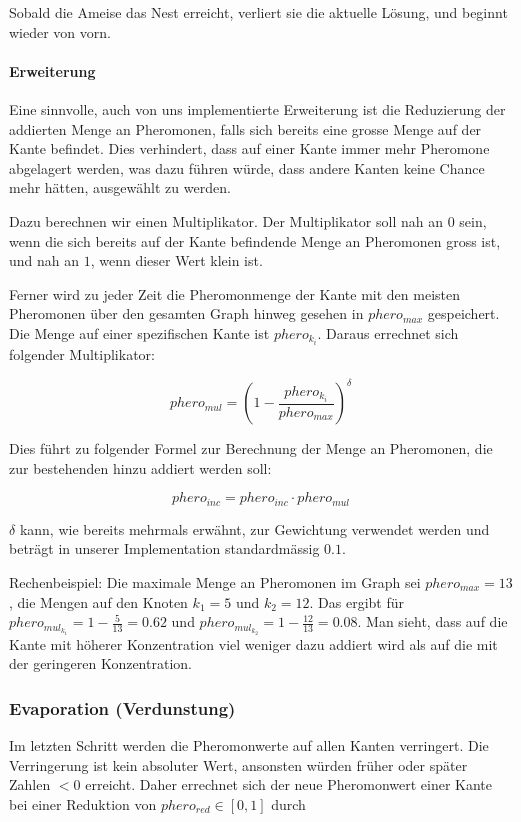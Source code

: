 Sobald die Ameise das Nest erreicht, verliert sie die aktuelle Lösung, und
beginnt wieder von vorn.

\paragraph*{Erweiterung}

Eine sinnvolle, auch von uns implementierte Erweiterung ist die Reduzierung der
addierten Menge an Pheromonen, falls sich bereits eine grosse Menge auf der
Kante befindet. Dies verhindert, dass auf einer Kante immer mehr Pheromone
abgelagert werden, was dazu führen würde, dass andere Kanten keine Chance mehr
hätten, ausgewählt zu werden.

Dazu berechnen wir einen Multiplikator. Der Multiplikator soll nah an $0$ sein,
wenn die sich bereits auf der Kante befindende Menge an Pheromonen gross ist,
und nah an $1$, wenn dieser Wert klein ist.

Ferner wird zu jeder Zeit die Pheromonmenge der Kante mit den meisten Pheromonen
über den gesamten Graph hinweg gesehen in  $phero_{max}$ gespeichert. Die Menge
auf einer spezifischen Kante ist $phero_{k_i}$. Daraus errechnet sich folgender
Multiplikator:

\[ phero_{mul} = \left({ 1 - \frac{phero_{k_i}}{phero_{max}}}\right)^\delta \]

\noindent Dies führt zu folgender Formel zur Berechnung der Menge an Pheromonen,
die zur bestehenden hinzu addiert werden soll:

\[ phero_{inc} = phero_{inc} \cdot phero_{mul} \]

\noindent $\delta$ kann, wie bereits mehrmals erwähnt, zur Gewichtung verwendet
werden und beträgt in unserer Implementation standardmässig $0.1$.

Rechenbeispiel: Die maximale Menge an Pheromonen im Graph sei $phero_{max} =
13$, die Mengen auf den Knoten $k_1 = 5$ und $k_2 = 12$. Das ergibt für
$phero_{mul_{k_1}} = 1 - \frac{5}{13} = 0.62$ und $phero_{mul_{k_2}} = 1 -
\frac{12}{13} = 0.08$. Man sieht, dass auf die Kante mit höherer Konzentration
viel weniger dazu addiert wird als auf die mit der geringeren Konzentration.

\subsubsection*{Evaporation (Verdunstung)}

Im letzten Schritt werden die Pheromonwerte auf allen Kanten verringert. Die
Verringerung ist kein absoluter Wert, ansonsten würden früher oder später Zahlen
$< 0$ erreicht. Daher errechnet sich der neue Pheromonwert einer Kante bei einer
Reduktion von $phero_{red} \in [0, 1]$ durch

